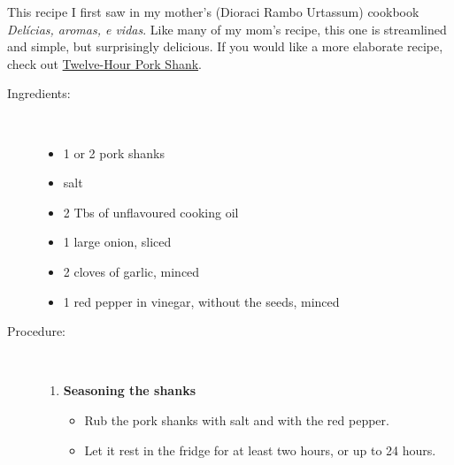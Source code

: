 \documentclass[11pt,letterpaper]{article}
\begin{document}


This recipe I first saw in my mother's (Dioraci Rambo Urtassum) cookbook {\it Del\'icias, aromas, e vidas}. Like many of my mom's recipe, this one is streamlined and simple, but surprisingly delicious. If you would like a more elaborate recipe, check out \href {TwelveHourPorkShank.html} {Twelve-Hour Pork Shank}.



\begin{description}

\item[Ingredients:]\ \\
	\begin{itemize}
	\item 1 or 2 pork shanks
	\item	salt
	\item 2 Tbs of unflavoured cooking oil
	\item 1 large onion, sliced
	\item 2 cloves of garlic, minced
	\item 1 red pepper in vinegar, without the seeds, minced
	\end{itemize}

\item[Procedure:]\ \\

	\begin{enumerate}
	\item {\bf Seasoning the shanks}
	\begin{itemize}
	\item Rub the pork shanks with salt and with the red pepper.
	\item Let it rest in the fridge for at least two hours, or up to 24 hours.
	\end{itemize}


\end{enumerate}
\end{description}
\end{document}
